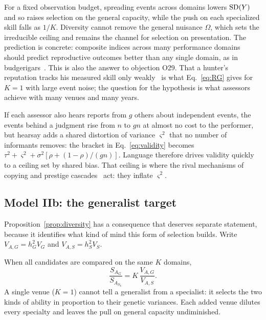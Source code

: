 For a fixed observation budget, spreading events across domains lowers $\operatorname{SD}(Y)$ and so raises selection on the general
capacity, while the push on each specialized skill falls as $1/K$. Diversity cannot remove the general nuisance $\Omega$,
which sets the irreducible ceiling and remains the channel for selection on presentation. The prediction is concrete:
composite indices across many performance domains should predict reproductive outcomes better than any single domain, as in
budgerigars~\cite{medinagarcia2021}. This is also the answer to objection O29. That a hunter's reputation tracks his measured
skill only weakly~\cite{stibbardhawkes2018} is what Eq.~\eqref{eq:RG} gives for $K=1$ with large event noise; the question for
the hypothesis is what assessors achieve with many venues and many years.

\begin{remark}
If each assessor also hears reports from $g$ others about independent events, the events behind a judgment rise from $n$ to
$gn$ at almost no cost to the performer, but hearsay adds a shared distortion of variance $\varsigma^2$ that no number of
informants removes: the bracket in Eq.~\eqref{eq:validity} becomes $\tau^2+\varsigma^2+\sigma^2[\rho+(1-\rho)/(gn)]$. Language
therefore drives validity quickly to a ceiling set by shared bias. That ceiling is where the rival mechanisms of copying and
prestige cascades~\cite{duval2023,gouda2018} act: they inflate $\varsigma^2$.
\end{remark}

\subsection{Model IIb: the generalist target}\label{sec:generalist}

Proposition~\ref{prop:diversity} has a consequence that deserves separate statement, because it identifies what kind of mind
this form of selection builds. Write $V_{A,G}=h_G^2V_G$ and $V_{A,S}=h_S^2V_S$.

\begin{corollary}\label{cor:generalist}
When all candidates are compared on the same $K$ domains,
\begin{equation}
\frac{S_{A_G}}{S_{A_{S_k}}}=K\,\frac{V_{A,G}}{V_{A,S}}.\label{eq:aimK}
\end{equation}
A single venue ($K=1$) cannot tell a generalist from a specialist: it selects the two kinds of ability in proportion to their
genetic variances. Each added venue dilutes every specialty and leaves the pull on general capacity undiminished.
\end{corollary}

